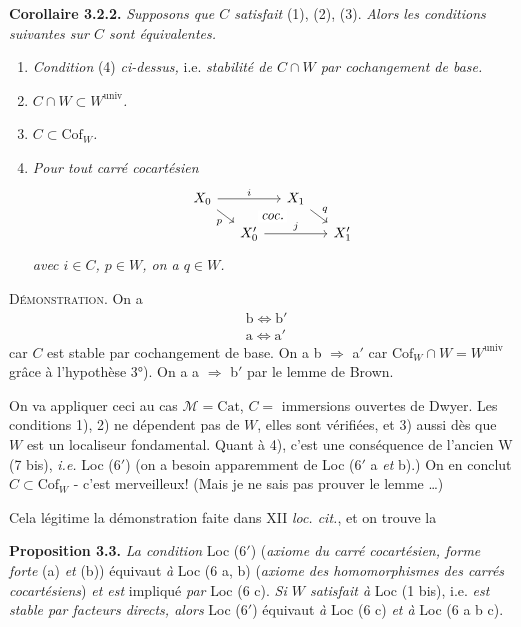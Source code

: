 \documentclass[11pt]{article}
\newcommand{\msp}[1]{\marginpar{\footnotesize [#1]}}
\newcommand{\Cof}{\mathrm{Cof}}
\newcommand{\univ}{\mathrm{univ}}
\begin{document}
\textbf{Corollaire 3.2.2.} \textit{Supposons que $C$ satisfait} (1), (2), (3). \textit{Alors}
\msp{page 21}\textit{les conditions suivantes sur $C$ sont équivalentes.}
\begin{enumerate}
\item[a)] \textit{Condition} (4) \textit{ci-dessus,} i.e. \textit{stabilité de $C \cap W$ par cochangement de base.}
\item[a$'$)] \textit{$C \cap W \subset W^{\univ}$.}
\item[b)] \textit{$C \subset \Cof_W$.}
\item[b$'$)] \textit{Pour tout carré cocartésien}
\[
\begin{tikzcd}[ampersand replacement=\&, row sep=small, column sep=small]
X_0 \arrow[rr, "i"] \arrow[dr, "p"'] \arrow[to=2-4, phantom, "\textit{coc.}" description] \& \& X_1 \arrow[dr, "q"] \& \\
\& X'_0 \arrow[rr, "j"] \& \& X'_1
\end{tikzcd}
\]
\textit{avec $i \in C$, $p \in W$, on a $q \in W$.}
\end{enumerate}
\textsc{Démonstration}. On a
\[
\begin{aligned}
&\text{b} \iff \text{b}'\\
&\text{a} \iff \text{a}'
\end{aligned}
\]
car $C$ est stable par cochangement de base. On a b $\Longrightarrow$ a$'$ car $\Cof_W \cap W = W^{\univ}$ grâce à l'hypothèse 3°). On a a $\Longrightarrow$ b$'$ par le lemme de Brown.

On va appliquer ceci au cas $\mathcal{M} = \mathrm{Cat}$, $C =$ immersions ouvertes de Dwyer. Les conditions 1), 2) ne dépendent pas de $W$, elles sont vérifiées, et 3) aussi dès que $W$ est un localiseur fondamental. Quant à 4), c'est une conséquence de l'ancien W (7 bis), \textit{i.e.} Loc (6$'$) (on a
\msp{page 22}besoin apparemment de Loc (6$'$ a \textit{et} b).) On en conclut $C \subset \Cof_W$ - c'est merveilleux! (Mais je ne sais pas prouver le lemme \dots)

Cela légitime la démonstration faite dans XII \textit{loc. cit.}, et on trouve la

\textbf{Proposition 3.3.} \textit{La condition} Loc (6$'$) (\textit{axiome du carré cocartésien, forme forte} (a) \textit{et} (b)) équivaut \textit{à} Loc (6 a, b) (\textit{axiome des homomorphismes des carrés cocartésiens}) \textit{et est} impliqué \textit{par} Loc (6 c). \textit{Si $W$ satisfait à} Loc (1 bis), i.e. \textit{est stable par facteurs directs, alors} Loc (6$'$) équivaut \textit{à} Loc (6 c) \textit{et à} Loc (6 a b c).
\end{document}
